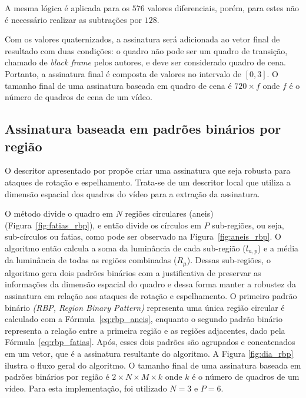 A mesma lógica é aplicada para os $576$ valores diferenciais, porém, para estes não é necessário realizar as subtrações por $128$.

Com os valores quaternizados, a assinatura será adicionada ao vetor final de resultado com duas condições: o quadro não pode ser um quadro de transição, chamado de \textit{black frame} pelos autores, e deve ser considerado quadro de cena. Portanto, a assinatura final é composta de valores no intervalo de $\left[0,3\right]$. O tamanho final de uma assinatura baseada em quadro de cena é $720 \times f$ onde $f$ é o número de quadros de cena de um vídeo.

%
\subsection{Assinatura baseada em padrões binários por região}


O descritor apresentado por  propõe criar uma assinatura que seja robusta para ataques de rotação e espelhamento. Trata-se de um descritor local que utiliza a dimensão espacial dos quadros do vídeo para a extração da assinatura. 


O método divide o quadro em $N$ regiões circulares (aneis) (Figura~\ref{fig:fatias_rbp}), e então divide os círculos em $P$ sub-regiões, ou seja, sub-círculos ou fatias, como pode ser observado na Figura~\ref{fig:aneis_rbp}. O algoritmo então calcula a soma da luminância de cada sub-região ($l_{n,p}$) e a média da luminância de todas as regiões combinadas ($R_\mu$). Dessas sub-regiões, o algoritmo gera dois padrões binários com a justificativa de preservar as informações da dimensão espacial do quadro e dessa forma manter a robustez da assinatura em relação aos ataques de rotação e espelhamento. O  primeiro padrão binário  \textit{(RBP, Region Binary Pattern)} representa uma única região circular é calculado com a Fórmula~\ref{eq:rbp_aneis}, enquanto o segundo padrão binário representa a relação entre a primeira região e as regiões adjacentes, dado pela Fórmula~\ref{eq:rbp_fatias}. Após, esses dois padrões são agrupados e concatenados em um vetor, que é a assinatura resultante do algoritmo. A Figura \ref{fig:dia_rbp} ilustra o fluxo geral do algoritmo. O tamanho final de uma assinatura baseada em padrões binários por região é $2 \times N \times M \times k$ onde $k$ é o número de quadros de um vídeo. Para esta implementação, foi utilizado $N = 3$ e $P = 6$.

